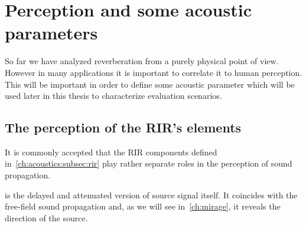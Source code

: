 \section{Perception and some acoustic parameters}\label{ch:acoustics:sec:perception}
So far we have analyzed reverberation from a purely physical point of view.
However in many applications it is important to correlate it to human perception.
This will be important in order to define some acoustic parameter which will be used later in this thesis to characterize evaluation scenarios.

\subsection{The perception of the \ac{RIR}'s elements}
It is commonly accepted that the \ac{RIR} components defined in~\cref{ch:acoustics:subsec:rir} play rather separate roles in the perception of sound propagation.

 is the delayed and attenuated version of source signal itself.
It coincides with the free-field sound propagation and, as we will see in~\cref{ch:mirage}, it reveals the direction of the source.


